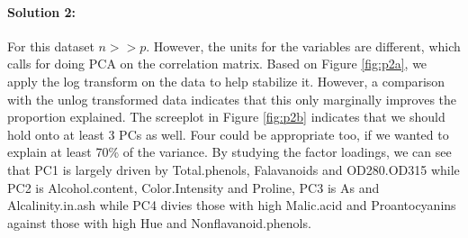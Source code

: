 \documentclass[12pt, leqno]{article}\usepackage[]{graphicx}\usepackage[]{color}
\begin{document}
\paragraph{Solution 2:} For this dataset $n>>p$. However, the units
for the variables are different, which calls for doing PCA on the
correlation matrix. Based on Figure \ref{fig:p2a}, we apply
the log transform on the data to help stabilize it. However, a
comparison with the unlog transformed data indicates that this only
marginally improves the proportion explained. The screeplot in Figure
\ref{fig:p2b} indicates that we should hold onto at least 3 PCs as
well. Four could be appropriate too, if we wanted to explain at least
70\% of the variance. By studying the factor loadings, we can see that
PC1 is largely driven by Total.phenols, Falavanoids and
OD280.OD315 while PC2 is Alcohol.content, Color.Intensity and Proline,
PC3 is As and Alcalinity.in.ash while PC4 divies those with high
Malic.acid and Proantocyanins against those with high Hue and Nonflavanoid.phenols.
\end{document}
